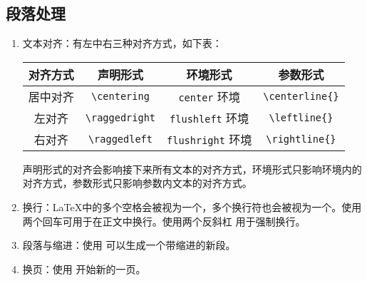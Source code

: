 \subsection{段落处理}
\begin{enumerate}

\item 文本对齐：有左中右三种对齐方式，如下表：

\begin{tcolorbox}[colback=white]
\centering
\begin{tabular}{cccc}
    对齐方式 & 声明形式 & 环境形式 & 参数形式 \\
\hline
    居中对齐 & \verb|\centering| & \verb|center| 环境 & \verb|\centerline{}| \\
    左对齐 & \verb|\raggedright| & \verb|flushleft| 环境 & \verb|\leftline{}| \\
    右对齐 & \verb|\raggedleft| & \verb|flushright| 环境 & \verb|\rightline{}| \\
\end{tabular}
\end{tcolorbox}

声明形式的对齐会影响接下来所有文本的对齐方式，环境形式只影响环境内的对齐方式，参数形式只影响参数内文本的对齐方式。

\item 换行：\LaTeX 中的多个空格会被视为一个，多个换行符也会被视为一个。使用两个回车可用于在正文中换行。使用两个反斜杠 \boxforcmd{\\\\} 用于强制换行。

\item 段落与缩进：使用 \boxforcmd{\\par} 可以生成一个带缩进的新段。

\item 换页：使用 \boxforcmd{\\newpage} 开始新的一页。 



\end{enumerate}